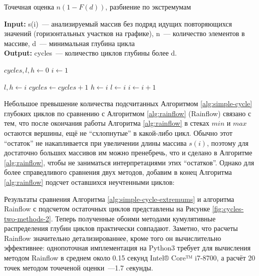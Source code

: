\begin{algorithm}
\caption{Точечная оценка $n(1 - F(d))$, разбиение по экстремумам} \label{alg:simple-cycle-extremums}
\hspace*{\algorithmicindent} \textbf{Input:} s(i)~--- анализируемый массив без подряд идущих повторяющихся значений (горизонтальных участков на графике), n~--- количество элементов в массиве, d~--- минимальная глубина цикла \\
\hspace*{\algorithmicindent} \textbf{Output:} cycles~--- количество циклов глубины более d.

\begin{algorithmic}[1]
\State $cycles, l, h \gets 0$
\State $i \gets 1$


        \State $l,h \gets i$
        \State $cycles \gets cycles +1$
    \Else
            \State $h \gets i$
        \EndIf
            \State $l \gets i$
        \EndIf
    \EndIf
\EndIf
\State $i \gets i+1$
\EndWhile
 
\end{algorithmic}
\end{algorithm}

Небольшое превышение количества подсчитанных Алгоритмом \ref{alg:simple-cycle} глубоких циклов по сравнению с Алгоритмом \ref{alg:rainflow} (Rainflow) связано с тем, что после окончания работы Алгоритма \ref{alg:rainflow} в стеках $min$ и $max$ остаются вершины, ещё не ``схлопнутые'' в какой-либо цикл. 
Обычно этот ``остаток'' не накапливается при увеличении длины массива $s(i)$, поэтому для достаточно больших массивов им можно пренебречь, что и сделано в Алгоритме \ref{alg:rainflow}, чтобы не заниматься интерпретациями этих ``остатков''.
Однако для более справедливого сравнения двух методов, добавим в конец  Алгоритма \ref{alg:rainflow} подсчет оставшихся неучтенными циклов:
\begin{algorithmic}
\EndWhile
\end{algorithmic}

Результаты сравнения Алгоритма \ref{alg:simple-cycle-extremums} и алгоритма Rainflow с подсчетом остаточных циклов представлены на Рисунке \ref{fig:cycles-two-methods-2}.
Теперь полученные обоими методами кумулятивные распределения глубин циклов практически совпадают.
Заметно, что расчеты Rainflow значительно детализированнее, кроме того он вычислительно эффективнее: однопоточная имплементация на Python3 требует для вычисления методом Rainflow в среднем около 0.15 секунд Intel® Core™ i7-8700, а расчёт 20 точек методом точеченой оценки~---1.7 cекунды.
